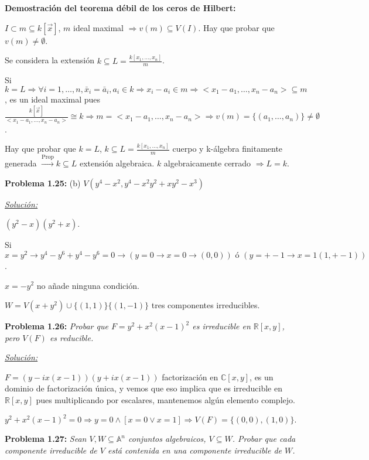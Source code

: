 \textbf{Demostración del teorema débil de los ceros de Hilbert:}

$I\subset m\subseteq k[\vec{x}]$, $m$ ideal maximal $\Rightarrow v(m)\subseteq V(I)$. Hay que probar que $v(m)\neq \emptyset $. 

Se considera la extensión $k\subseteq L=\frac{k[x_1,\dots,x_n]}{m}$. 

Si $k=L \Rightarrow \forall i=1,\dots, n, \bar{x}_i=\bar{a}_i, a_i\in k \Rightarrow x_i-a_i\in m \Rightarrow <x_1-a_1,\dots,x_n-a_n>\subseteq m$, es un ideal maximal pues $\frac{k[\vec{x}]}{<x_1-a_1,\dots,x_n-a_n>} \cong k \Rightarrow m=<x_1-a_1,\dots,x_n-a_n> \Rightarrow v(m)=\{ (a_1,\dots,a_n)\} \neq \emptyset $ .

Hay que probar que $k=L$, $k\subseteq L=\frac{k[x_1,\dots,x_n]}{m}$ cuerpo y k-álgebra finitamente generada $\xrightarrow{\text{Prop}} k\subseteq L$ extensión algebraica. $k$ algebraicamente cerrado $\Rightarrow L=k$.
\vspace{2mm}


\textbf{Problema 1.25:} (b) $V(y^4-x^2,y^4-x^2y^2+xy^2-x^3)$

\underline{\textit{Solución: }}

$(y^2-x)(y^2+x)$.

Si $x=y^2\rightarrow y^4-y^6+y^4-y^6 =0 \rightarrow (y=0 \rightarrow x=0 \rightarrow (0,0)) \text{ ó } (y=+-1 \rightarrow x=1 (1,+-1))$.

$x=-y^2$ no añade ninguna condición.

$W=V(x+y^2)\cup \{(1,1)\}\{(1,-1)\}$ tres componentes irreducibles.

\vspace{2mm}

\textbf{Problema 1.26: } \textit{Probar que $F=y^2+x^2(x-1)^2$ es irreducible en $\mathbb{R}[x,y]$, pero $V(F)$ es reducible.}

\underline{\textit{Solución: }}

$F=(y-ix(x-1))(y+ix(x-1))$ factorización en $\mathbb{C}[x,y]$, es un dominio de factorización única, y vemos que eso implica que es irreducible en $\mathbb{R}[x,y]$ pues multiplicando por escalares, mantenemos algún elemento complejo.

$y^2+x^2(x-1)^2=0 \Rightarrow y=0 \wedge [x=0 \vee x=1] \Rightarrow V(F)=\{(0,0),(1,0)\}.$

\vspace{2mm}
\textbf{Problema 1.27: } \textit{Sean $V,W\subseteq \mathbb{A}^n$ conjuntos algebraicos, $V\subseteq W$. Probar que cada componente irreducible de $V$ está contenida en una componente irreducible de $W$.}

